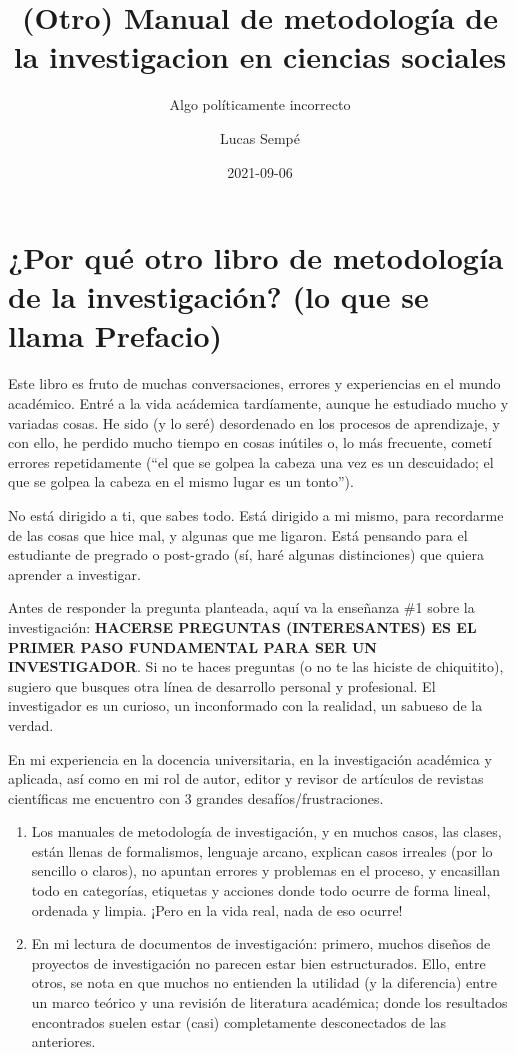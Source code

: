 \documentclass[
]{book}
\title{(Otro) Manual de metodología de la investigacion en ciencias sociales}
\subtitle{Algo políticamente incorrecto}
\author{Lucas Sempé}
\date{2021-09-06}
\begin{document}
\maketitle

{
\setcounter{tocdepth}{1}
\tableofcontents
}
\hypertarget{por-quuxe9-otro-libro-de-metodologuxeda-de-la-investigaciuxf3n-lo-que-se-llama-prefacio}{%
\chapter{¿Por qué otro libro de metodología de la investigación? (lo que se llama Prefacio)}\label{por-quuxe9-otro-libro-de-metodologuxeda-de-la-investigaciuxf3n-lo-que-se-llama-prefacio}}

Este libro es fruto de muchas conversaciones, errores y experiencias en el mundo académico. Entré a la vida acádemica tardíamente, aunque he estudiado mucho y variadas cosas. He sido (y lo seré) desordenado en los procesos de aprendizaje, y con ello, he perdido mucho tiempo en cosas inútiles o, lo más frecuente, cometí errores repetidamente (``el que se golpea la cabeza una vez es un descuidado; el que se golpea la cabeza en el mismo lugar es un tonto'').

No está dirigido a ti, que sabes todo. Está dirigido a mi mismo, para recordarme de las cosas que hice mal, y algunas que me ligaron. Está pensando para el estudiante de pregrado o post-grado (sí, haré algunas distinciones) que quiera aprender a investigar.

Antes de responder la pregunta planteada, aquí va la enseñanza \#1 sobre la investigación: \textbf{HACERSE PREGUNTAS (INTERESANTES) ES EL PRIMER PASO FUNDAMENTAL PARA SER UN INVESTIGADOR}. Si no te haces preguntas (o no te las hiciste de chiquitito), sugiero que busques otra línea de desarrollo personal y profesional. El investigador es un curioso, un inconformado con la realidad, un sabueso de la verdad.

En mi experiencia en la docencia universitaria, en la investigación académica y aplicada, así como en mi rol de autor, editor y revisor de artículos de revistas científicas me encuentro con 3 grandes desafíos/frustraciones.

\begin{enumerate}
\def\labelenumi{\arabic{enumi})}
\item
  Los manuales de metodología de investigación, y en muchos casos, las clases, están llenas de formalismos, lenguaje arcano, explican casos irreales (por lo sencillo o claros), no apuntan errores y problemas en el proceso, y encasillan todo en categorías, etiquetas y acciones donde todo ocurre de forma lineal, ordenada y limpia. ¡Pero en la vida real, nada de eso ocurre!
\item
  En mi lectura de documentos de investigación: primero, muchos diseños de proyectos de investigación no parecen estar bien estructurados. Ello, entre otros, se nota en que muchos no entienden la utilidad (y la diferencia) entre un marco teórico y una revisión de literatura académica; donde los resultados encontrados suelen estar (casi) completamente desconectados de las anteriores.
\end{enumerate}
\end{document}
